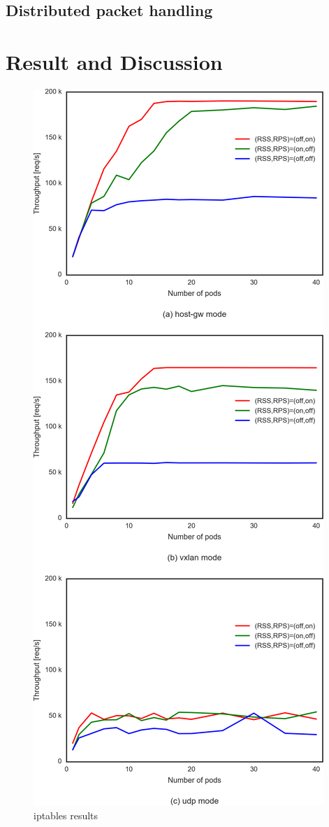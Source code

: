 \subsection{Distributed packet handling}




\section{Result and Discussion}\label{Result and Discussion}

\begin{figure}
\includegraphics[width=\textwidth]{Figs/iptables_3figs}
\caption{iptables results}
\label{fig:iptabls3figs}
\end{figure}

